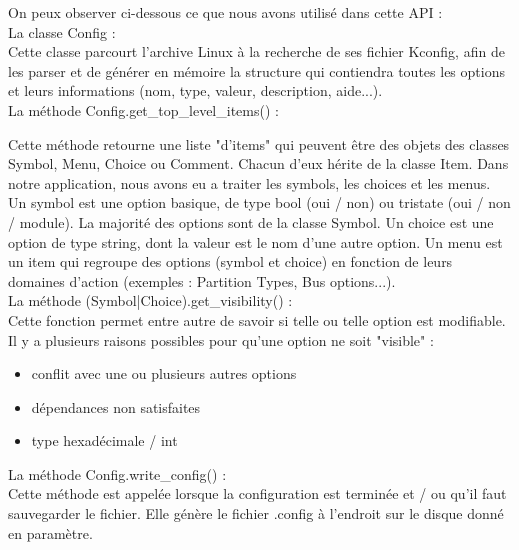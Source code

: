 \documentclass[16pts]{report}
\begin{document}
    On peux observer ci-dessous ce que nous avons utilisé dans cette API : \\

    La classe Config :\\

        Cette classe parcourt l'archive Linux à la recherche 
        de ses fichier Kconfig, 
        afin de les parser et de générer en mémoire la structure qui 
        contiendra toutes les options et leurs informations (nom, type, valeur, description, aide...). \\

    La méthode Config.get\_top\_level\_items() :

        Cette méthode retourne une liste "d'items" qui peuvent être des objets des 
        classes Symbol, Menu, Choice ou Comment. Chacun d'eux hérite de la classe Item.
        Dans notre application, nous avons eu a traiter les symbols, les choices et
        les menus.\\

        Un symbol est une option basique, de type bool (oui / non) ou tristate (oui /
        non / module). La majorité des options sont de la classe Symbol.
        Un choice est une option de type string, dont la valeur est le nom d'une autre
        option.
        Un menu est un item qui regroupe des options (symbol et choice) en fonction 
        de leurs domaines d'action (exemples : Partition Types, Bus options...).\\

    La méthode (Symbol|Choice).get\_visibility() : \\
       
        Cette fonction permet entre autre de savoir si telle ou telle option est 
        modifiable. Il y a plusieurs raisons possibles pour qu'une option ne soit 
        "visible" : 
        \begin{itemize}
            \item conflit avec une ou plusieurs autres options
            \item dépendances non satisfaites
            \item type hexadécimale / int
        \end{itemize}

    La méthode Config.write\_config() :\\
       
        Cette méthode est appelée lorsque la configuration est terminée et / ou qu'il 
        faut sauvegarder le fichier. Elle génère le fichier .config à l'endroit sur le
        disque donné en paramètre.\\
\end{document}
